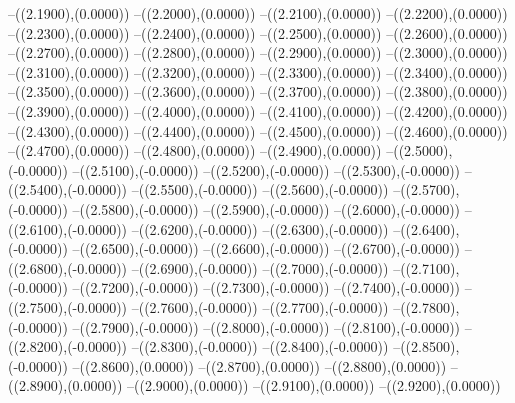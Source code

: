 {	--({\sx*(2.1900)},{\sy*(0.0000)})
	--({\sx*(2.2000)},{\sy*(0.0000)})
	--({\sx*(2.2100)},{\sy*(0.0000)})
	--({\sx*(2.2200)},{\sy*(0.0000)})
	--({\sx*(2.2300)},{\sy*(0.0000)})
	--({\sx*(2.2400)},{\sy*(0.0000)})
	--({\sx*(2.2500)},{\sy*(0.0000)})
	--({\sx*(2.2600)},{\sy*(0.0000)})
	--({\sx*(2.2700)},{\sy*(0.0000)})
	--({\sx*(2.2800)},{\sy*(0.0000)})
	--({\sx*(2.2900)},{\sy*(0.0000)})
	--({\sx*(2.3000)},{\sy*(0.0000)})
	--({\sx*(2.3100)},{\sy*(0.0000)})
	--({\sx*(2.3200)},{\sy*(0.0000)})
	--({\sx*(2.3300)},{\sy*(0.0000)})
	--({\sx*(2.3400)},{\sy*(0.0000)})
	--({\sx*(2.3500)},{\sy*(0.0000)})
	--({\sx*(2.3600)},{\sy*(0.0000)})
	--({\sx*(2.3700)},{\sy*(0.0000)})
	--({\sx*(2.3800)},{\sy*(0.0000)})
	--({\sx*(2.3900)},{\sy*(0.0000)})
	--({\sx*(2.4000)},{\sy*(0.0000)})
	--({\sx*(2.4100)},{\sy*(0.0000)})
	--({\sx*(2.4200)},{\sy*(0.0000)})
	--({\sx*(2.4300)},{\sy*(0.0000)})
	--({\sx*(2.4400)},{\sy*(0.0000)})
	--({\sx*(2.4500)},{\sy*(0.0000)})
	--({\sx*(2.4600)},{\sy*(0.0000)})
	--({\sx*(2.4700)},{\sy*(0.0000)})
	--({\sx*(2.4800)},{\sy*(0.0000)})
	--({\sx*(2.4900)},{\sy*(0.0000)})
	--({\sx*(2.5000)},{\sy*(-0.0000)})
	--({\sx*(2.5100)},{\sy*(-0.0000)})
	--({\sx*(2.5200)},{\sy*(-0.0000)})
	--({\sx*(2.5300)},{\sy*(-0.0000)})
	--({\sx*(2.5400)},{\sy*(-0.0000)})
	--({\sx*(2.5500)},{\sy*(-0.0000)})
	--({\sx*(2.5600)},{\sy*(-0.0000)})
	--({\sx*(2.5700)},{\sy*(-0.0000)})
	--({\sx*(2.5800)},{\sy*(-0.0000)})
	--({\sx*(2.5900)},{\sy*(-0.0000)})
	--({\sx*(2.6000)},{\sy*(-0.0000)})
	--({\sx*(2.6100)},{\sy*(-0.0000)})
	--({\sx*(2.6200)},{\sy*(-0.0000)})
	--({\sx*(2.6300)},{\sy*(-0.0000)})
	--({\sx*(2.6400)},{\sy*(-0.0000)})
	--({\sx*(2.6500)},{\sy*(-0.0000)})
	--({\sx*(2.6600)},{\sy*(-0.0000)})
	--({\sx*(2.6700)},{\sy*(-0.0000)})
	--({\sx*(2.6800)},{\sy*(-0.0000)})
	--({\sx*(2.6900)},{\sy*(-0.0000)})
	--({\sx*(2.7000)},{\sy*(-0.0000)})
	--({\sx*(2.7100)},{\sy*(-0.0000)})
	--({\sx*(2.7200)},{\sy*(-0.0000)})
	--({\sx*(2.7300)},{\sy*(-0.0000)})
	--({\sx*(2.7400)},{\sy*(-0.0000)})
	--({\sx*(2.7500)},{\sy*(-0.0000)})
	--({\sx*(2.7600)},{\sy*(-0.0000)})
	--({\sx*(2.7700)},{\sy*(-0.0000)})
	--({\sx*(2.7800)},{\sy*(-0.0000)})
	--({\sx*(2.7900)},{\sy*(-0.0000)})
	--({\sx*(2.8000)},{\sy*(-0.0000)})
	--({\sx*(2.8100)},{\sy*(-0.0000)})
	--({\sx*(2.8200)},{\sy*(-0.0000)})
	--({\sx*(2.8300)},{\sy*(-0.0000)})
	--({\sx*(2.8400)},{\sy*(-0.0000)})
	--({\sx*(2.8500)},{\sy*(-0.0000)})
	--({\sx*(2.8600)},{\sy*(0.0000)})
	--({\sx*(2.8700)},{\sy*(0.0000)})
	--({\sx*(2.8800)},{\sy*(0.0000)})
	--({\sx*(2.8900)},{\sy*(0.0000)})
	--({\sx*(2.9000)},{\sy*(0.0000)})
	--({\sx*(2.9100)},{\sy*(0.0000)})
	--({\sx*(2.9200)},{\sy*(0.0000)})
}
